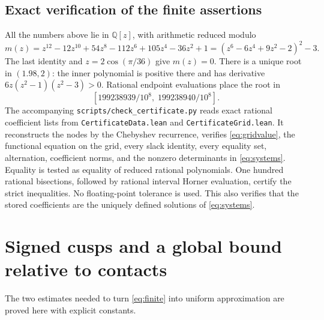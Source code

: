 \documentclass[11pt]{article}
\begin{document}
\subsection*{Exact verification of the finite assertions}
All the numbers above lie in $\mathbb Q[z]$, with arithmetic reduced modulo
\[
 m(z)=z^{12}-12z^{10}+54z^8-112z^6+105z^4-36z^2+1
      =(z^6-6z^4+9z^2-2)^2-3.
\]
The last identity and $z=2\cos(\pi/36)$ give $m(z)=0$. There is a unique root
in $(1.98,2)$: the inner polynomial is positive there and has derivative
$6z(z^2-1)(z^2-3)>0$. Rational endpoint evaluations place the root in
\[
 [199238939/10^8,\;199238940/10^8].
\]
The accompanying \texttt{scripts/check\_certificate.py} reads exact rational
coefficient lists from \texttt{CertificateData.lean} and
\texttt{CertificateGrid.lean}. It reconstructs the nodes by the Chebyshev
recurrence, verifies \eqref{eq:gridvalue}, the functional equation on the grid,
every slack identity, every equality set, alternation, coefficient norms, and
the nonzero determinants in \eqref{eq:systems}. Equality is tested as equality
of reduced rational polynomials. One hundred rational bisections, followed by
rational interval Horner evaluation, certify the strict inequalities. No
floating-point tolerance is used. This also verifies that the stored
coefficients are the uniquely defined solutions of \eqref{eq:systems}.

\section{Signed cusps and a global bound relative to contacts}
The two estimates needed to turn \eqref{eq:finite} into uniform approximation
are proved here with explicit constants.
\end{document}
